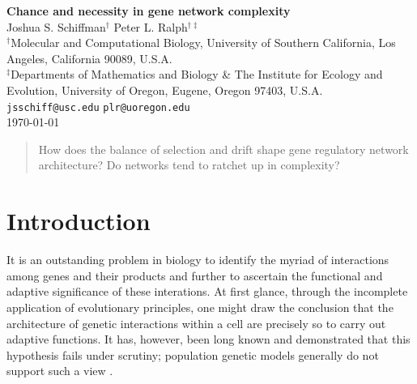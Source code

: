 \documentclass{article}
\newcommand{\1}{\mathbbm{1}}
\begin{document}
\linenumbers

{\centering
{\Huge \bf Chance and necessity in gene network complexity} \\ \vspace{0.75cm}
Joshua S. Schiffman$^{\dagger}$ \qquad Peter L. Ralph$^{\dagger \ddagger}$ \\ \vspace{0.5cm}
$^{\dagger}${\footnotesize {Molecular and Computational Biology, University of Southern California, Los Angeles, California 90089, U.S.A. \\
$^{\ddagger}$Departments of Mathematics and Biology \& The Institute for Ecology and Evolution, University of Oregon, Eugene, Oregon 97403, U.S.A.}} \\ \vspace{0.5cm}
{\small \texttt{jsschiff@usc.edu} \qquad 
\texttt{plr@uoregon.edu}} \\ \vspace{0.5cm}
\small \today \\
\vspace{0.25cm}
}


\begin{abstract}
How does the balance of selection and drift shape gene regulatory network architecture? Do networks tend to ratchet up in complexity? 
\end{abstract}


\section{Introduction}



It is an outstanding problem in biology to identify the myriad of interactions
among genes and their products and further to ascertain the functional and adaptive
significance of these interations.
At first glance, through the incomplete application of evolutionary principles,
one might draw the conclusion that the architecture of genetic
interactions within a cell are precisely so to carry out adaptive functions.
It has, however, been long known and demonstrated that this hypothesis fails under scrutiny;
population genetic models generally do not support such a view \cite{lynch2007evolution}. 
\end{document}
